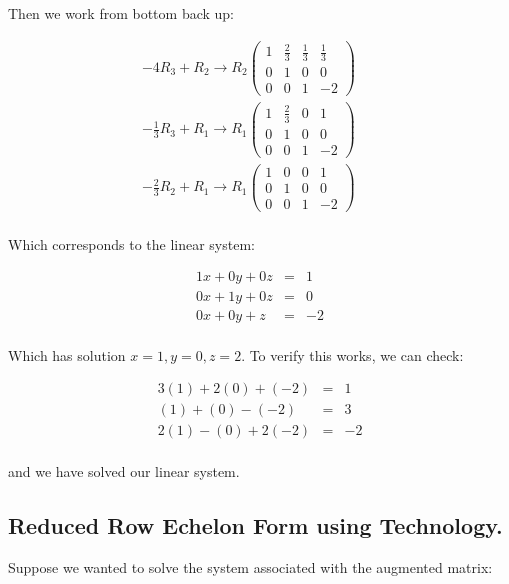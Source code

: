 \begin{example}
Then we work from bottom back up:

\begin{eqnarray*}
-4R_3 + R_2\to R_2\left( \begin{array}{rrr|r}
1 & \frac{2}{3} & \frac{1}{3} & \frac{1}{3}\\
0 & 1  & 0 & 0\\
0 & 0 & 1 & -2
\end{array}\right)&&\\
-\frac{1}{3}R_3 + R_1\to R_1\left( \begin{array}{rrr|r}
1 & \frac{2}{3} & 0 & 1\\
0 & 1  & 0 & 0\\
0 & 0 & 1 & -2
\end{array}\right)&&\\
-\frac{2}{3}R_2 + R_1\to R_1\left( \begin{array}{rrr|r}
1 & 0 & 0 & 1\\
0 & 1  & 0 & 0\\
0 & 0 & 1 & -2
\end{array}\right)&&\\
\end{eqnarray*}

Which corresponds to the linear system:


\begin{eqnarray*}
1x+0y+0z&=&1\\
0x+1y+0z&=&0\\
0x+0y+z&=&-2\\
\end{eqnarray*}

Which has solution $x=1, y=0, z=2$.  To verify this works, we can check:

\begin{eqnarray*}
3(1)+2(0)+(-2)&=&1\\
(1)+(0)-(-2)&=&3\\
2(1)-(0)+2(-2)&=&-2\\
\end{eqnarray*}

and we have solved our linear system.


\end{example}

\subsection{Reduced Row Echelon Form using Technology.}

Suppose we wanted to solve the system associated with the augmented matrix:

